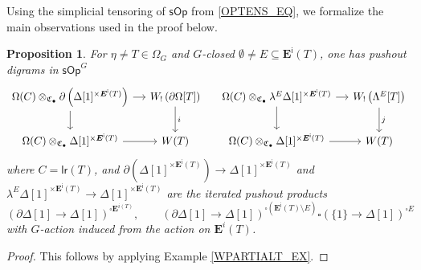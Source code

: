 \documentclass[a4paper,10pt
,draft
]{article}%
\numberwithin{equation}{section}
\numberwithin{figure}{section}
\newtheorem{proposition}[equation]{Proposition}%
\theoremstyle{definition} %
\newcommand{\sOp}{\ensuremath{\mathsf{sOp}}}%
\newcommand{\1}{\ensuremath{\mathbbm 1}}%
\begin{document}
Using the simplicial tensoring of $\sOp$ from \eqref{OPTENS_EQ},
we formalize the main observations used in the proof \cite[Prop. 4.5]{CM13b} below.
\begin{proposition}
      \label{WLEFTQPUSH PROP}
      For $\eta \neq T \in \Omega_G$
      and $G$-closed $\emptyset \neq E \subseteq \boldsymbol{E}^{\mathsf{i}}(T)$,
      one has pushout digrams in $\sOp^G$
      \begin{equation}\label{WLEFTQPUSH_EQ}
            \begin{tikzcd}[column sep = small]
                  \Omega(C) \otimes_{\mathfrak C_\bullet}
                  \partial \left(\Delta[1]^{\times \boldsymbol{E}^{\mathsf{i}}(T)}\right)
                  \ar{r} \ar{d}
                  &
                  W_! \left(\partial \Omega[T]\right) 
                  \arrow[d, "i"]
                  & %
                  \Omega(C) \otimes_{\mathfrak C_\bullet}
                  \lambda^E \Delta[1]^{\times \boldsymbol{E}^{\mathsf{i}}(T)}
                  \ar{r} \ar{d}
                  &
                  W_! \left(\Lambda^E[T]\right) 
                  \arrow[d, "j"]
                  \\
                  \Omega(C) \otimes_{\mathfrak C_\bullet}
                  \Delta[1]^{\times \boldsymbol{E}^{\mathsf{i}}(T)}
                  \ar{r}
                  &
                  W(T)
                  & %
                  \Omega(C) \otimes_{\mathfrak C_\bullet}
                  \Delta[1]^{\times \boldsymbol{E}^{\mathsf{i}}(T)}
                  \ar{r}
                  &
                  W(T)
            \end{tikzcd}
      \end{equation}
      where
      $C = \mathsf{lr}(T)$, and
      $\partial \left(\Delta[1]^{\times \boldsymbol{E}^{\mathsf{i}}(T)}\right)
      \to
      \Delta[1]^{\times \boldsymbol{E}^{\mathsf{i}}(T)}$
      and
      $\lambda^E \Delta[1]^{\times \boldsymbol{E}^{\mathsf{i}}(T)}
      \to \Delta[1]^{\times \boldsymbol{E}^{\mathsf{i}}(T)}$
      are the iterated pushout products
      \[
            \left(
                  \partial\Delta[1] \to \Delta[1]
            \right)^{\square \boldsymbol E^{i(T)}},
            \qquad
            \left(
                  \partial \Delta[1] \to \Delta[1]
            \right)^{\square (\boldsymbol{E}^{\mathsf{i}}(T) \setminus E)}
            \square
            \left(
                  \{1\} \to \Delta[1]
            \right)^{\square E}
      \]
      with $G$-action induced from the action on $\boldsymbol{E}^i(T)$.
\end{proposition}
\begin{proof}
      This follows by applying Example \ref{WPARTIALT_EX}.
\end{proof}
\end{document}
